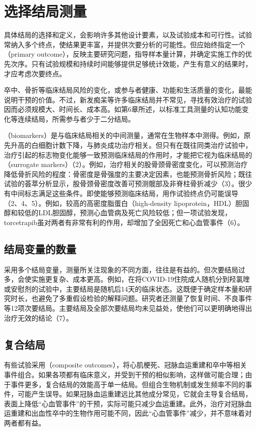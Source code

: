 \section{选择结局测量}
具体结局的选择和定义，会影响许多其他设计要素，以及试验成本和可行性。试验常纳入多个终点，使结果更丰富，并提供次要分析的可能性。但应始终指定一个（primary outcome），反映主要研究问题，指导样本量计算，并确定实施工作的优先次序。只有试验规模和持续时间能够提供足够统计效能，产生有意义的结果时，才应考虑次要终点。

卒中、骨折等临床结局风险的变化，或参与者健康、功能和生活质量的变化，最能说明干预的价值。不过，新发痴呆等许多临床结局并不常见，寻找有效治疗的试验因而必须规模大、时间长、成本高。如第6章所述，以标准工具测量的认知功能变化等连续结局，所需参与者少于二分结局。

（biomarkers）是与临床结局相关的中间测量，通常在生物样本中测得。例如，原先升高的白细胞计数下降，与肺炎成功治疗相关。但只有在既往同类治疗试验中，治疗引起的标志物变化能够一致预测临床结局的作用时，才能把它视为临床结局的（surrogate markers）（2）。例如，治疗相关的股骨颈骨密度变化，可以预测治疗降低骨折风险的程度：骨密度是骨强度的主要决定因素，也能预测骨折风险；既往试验的荟萃分析显示，股骨颈骨密度改善可预测髋部及非脊柱骨折减少（3）。很少有中间标志满足这些条件。即使能够预测临床结局，用作试验终点仍可能误导（2、4、5）。例如，较高的高密度脂蛋白（high-density lipoprotein，HDL）胆固醇和较低的LDL胆固醇，预测心血管病及死亡风险较低；但一项试验发现，torcetrapib虽对两者有非常有利的作用，却增加了全因死亡和心血管事件（6）。

\subsection{结局变量的数量}
采用多个结局变量，测量所关注现象的不同方面，往往是有益的。但次要结局过多，会使实施更复杂、成本更高。例如，在将COVID-19住院成人随机分到羟氯喹或安慰剂的试验中，主要结局是随机后14天的临床状态。这既便于确定样本量和研究时长，也避免了多重假设检验的解释问题。研究者还测量了恢复时间、不良事件等12项次要结局。主要结局及全部次要结局均未见益处，使他们可以更明确地得出治疗无效的结论（7）。

\subsection{复合结局}
有些试验采用（composite outcomes），将心肌梗死、冠脉血运重建和卒中等相关事件组合。如果各项都有临床意义，并受到干预的相似影响，这样做可能合理；由于事件更多，复合结局的效能高于单一结局。但组合生物机制或发生频率不同的事件，可能产生误导。如果冠脉血运重建远比其他成分常见，它就会主导复合结局，表面上降低“心血管事件”的干预，实际可能只减少血运重建。此外，治疗对冠脉血运重建和出血性卒中的生物作用可能不同，因此“心血管事件”减少，并不意味着对两者都有益。


